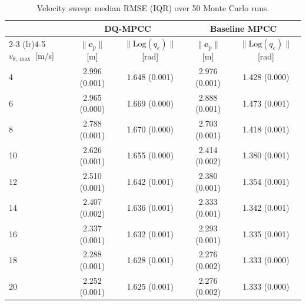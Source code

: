\begin{table}[t]
  \centering
  \caption{Velocity sweep: median RMSE (IQR) over 50 Monte Carlo runs.}
  \label{tab:velocity_sweep}
  \setlength{\tabcolsep}{3pt}
  \begin{tabular}{l cc cc}
    \toprule
    & \multicolumn{2}{c}{\textbf{DQ-MPCC}}
    & \multicolumn{2}{c}{\textbf{Baseline MPCC}} \\
    \cmidrule(lr){2-3} \cmidrule(lr){4-5}
    $v_{\theta,\max}$ [m/s]
    & $\|\mathbf{e}_p\|$ [m] & $\|\mathrm{Log}(q_e)\|$ [rad]
    & $\|\mathbf{e}_p\|$ [m] & $\|\mathrm{Log}(q_e)\|$ [rad] \\
    \midrule
    4 & 2.996 (0.001) & 1.648 (0.001) & 2.976 (0.001) & 1.428 (0.000) \\
    6 & 2.965 (0.000) & 1.669 (0.000) & 2.888 (0.001) & 1.473 (0.001) \\
    8 & 2.788 (0.001) & 1.670 (0.000) & 2.703 (0.001) & 1.418 (0.001) \\
    10 & 2.626 (0.001) & 1.655 (0.000) & 2.414 (0.002) & 1.380 (0.001) \\
    12 & 2.510 (0.001) & 1.642 (0.001) & 2.380 (0.001) & 1.354 (0.001) \\
    14 & 2.407 (0.002) & 1.636 (0.001) & 2.333 (0.001) & 1.342 (0.001) \\
    16 & 2.337 (0.001) & 1.632 (0.001) & 2.293 (0.001) & 1.335 (0.001) \\
    18 & 2.288 (0.001) & 1.628 (0.001) & 2.276 (0.002) & 1.333 (0.000) \\
    20 & 2.252 (0.001) & 1.625 (0.001) & 2.276 (0.002) & 1.333 (0.000) \\
    \bottomrule
  \end{tabular}
\end{table}

